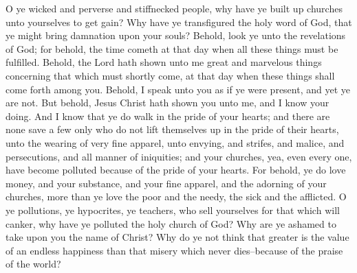 O ye wicked and perverse and stiffnecked people, why have ye built up churches unto yourselves to get gain? Why have ye transfigured the holy word of God, that ye might bring damnation upon your souls? Behold, look ye unto the revelations of God; for behold, the time cometh at that day when all these things must be fulfilled.
\bverse \iffalse Behold, the Lord hath shown unto me great and marvelous things concerning that which must shortly come, at that day when these things shall come forth among you. \fi
Behold, the Lord hath shown unto me great and marvelous things concerning that which must shortly come, at that day when these things shall come forth among you.
\bverse \iffalse Behold, I speak unto you as if ye were present, and yet ye are not. But behold, Jesus Christ hath shown you unto me, and I know your doing. \fi
Behold, I speak unto you as if ye were present, and yet ye are not. But behold, Jesus Christ hath shown you unto me, and I know your doing.
\bverse \iffalse And I know that ye do walk in the pride of your hearts; and there are none save a few only who do not lift themselves up in the pride of their hearts, unto the wearing of very fine apparel, unto envying, and strifes, and malice, and persecutions, and all manner of iniquities; and your churches, yea, even every one, have become polluted because of the pride of your hearts. \fi
And I know that ye do walk in the pride of your hearts; and there are none save a few only who do not lift themselves up in the pride of their hearts, unto the wearing of very fine apparel, unto envying, and strifes, and malice, and persecutions, and all manner of iniquities; and your churches, yea, even every one, have become polluted because of the pride of your hearts.
\bverse \iffalse For behold, ye do love money, and your substance, and your fine apparel, and the adorning of your churches, more than ye love the poor and the needy, the sick and the afflicted. \fi
For behold, ye do love money, and your substance, and your fine apparel, and the adorning of your churches, more than ye love the poor and the needy, the sick and the afflicted.
\bverse \iffalse O ye pollutions, ye hypocrites, ye teachers, who sell yourselves for that which will canker, why have ye polluted the holy church of God? Why are ye ashamed to take upon you the name of Christ? Why do ye not think that greater is the value of an endless happiness than that misery which never dies--because of the praise of the world? \fi
O ye pollutions, ye hypocrites, ye teachers, who sell yourselves for that which will canker, why have ye polluted the holy church of God? Why are ye ashamed to take upon you the name of Christ? Why do ye not think that greater is the value of an endless happiness than that misery which never dies--because of the praise of the world?
